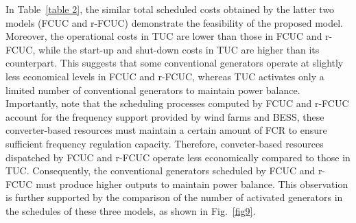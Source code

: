 \documentclass[lettersize,journal]{IEEEtran}
\begin{document}

In Table~\ref{table 2}, the similar total scheduled costs obtained by the latter two models (FCUC and r-FCUC) demonstrate the feasibility of the proposed model. Moreover, the operational costs in TUC are lower than those in FCUC and r-FCUC, while the start-up and shut-down costs in TUC are higher than its counterpart. This suggests that some conventional generators operate at slightly less economical levels in FCUC and r-FCUC, whereas TUC activates only a limited number of conventional generators to maintain power balance. Importantly, note that the scheduling processes computed by FCUC and r-FCUC account for the frequency support provided by wind farms and BESS, these converter-based resources must maintain a certain amount of FCR to ensure sufficient frequency regulation capacity. Therefore, conveter-based resources dispatched by FCUC and r-FCUC operate less economically compared to those in TUC. Consequently, the conventional generators scheduled by FCUC and r-FCUC must produce higher outputs to maintain power balance. This observation is further supported by the comparison of the number of activated generators in the schedules of these three models, as shown in Fig.~\ref{fig9}.
\end{document}
